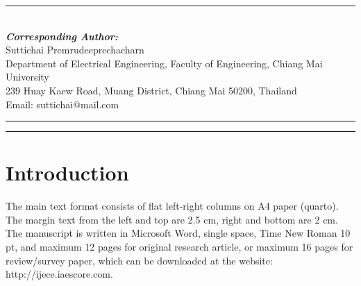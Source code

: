 \documentclass{iaesarticle}
\begin{document}
\parbox[t][][s]{0.65\textwidth}{%
\begin{abstract}
\vspace{.3em}
An abstract is often presented separate from the article, so it must be able to stand alone. A well-prepared abstract enables the reader to identify the basic content of a document quickly and accurately, to determine its relevance to their interests, and thus to decide whether to read the document in its entirety. The abstract should be informative and completely self-explanatory, provide a clear statement of the problem, the proposed approach or solution, and point out major findings and conclusions. The Abstract should be 100 to 200 words in length. References should be avoided, but if essential, then cite the author(s) and year(s). Standard nomenclature should be used, and non-standard or uncommon abbreviations should be avoided, but if essential they must be defined at their first mention in the abstract itself. No literature should be cited. The keyword list provides the opportunity to add 5 to 7 keywords, used by the indexing and abstracting services, in addition to those already present in the title (9 pt).
\end{abstract}
}
\parbox[l]{\textwidth}{%
\rule{0.275\textwidth}{0.5pt} \hspace{0.5cm} \hrulefill
\\
\emph{\textbf{Corresponding Author:}}
\vspace{.5em}\\
Suttichai Premrudeeprechacharn\\
Department of Electrical Engineering, Faculty of Engineering, Chiang Mai University\\
239 Huay Kaew Road, Muang District, Chiang Mai 50200, Thailand\\
Email: suttichai@mail.com
}
\vspace{.5em}
\hrule
\vspace{.1em}
\hrule

\section{Introduction}
\label{}
The main text format consists of flat left-right columns on A4 paper (quarto). The margin text from the left and top are 2.5 cm, right and bottom are 2 cm. The manuscript is written in Microsoft Word, single space, Time New Roman 10 pt, and maximum 12 pages for original research article, or maximum 16 pages for review/survey paper, which can be downloaded at the website: http://ijece.iaescore.com.
\end{document}
